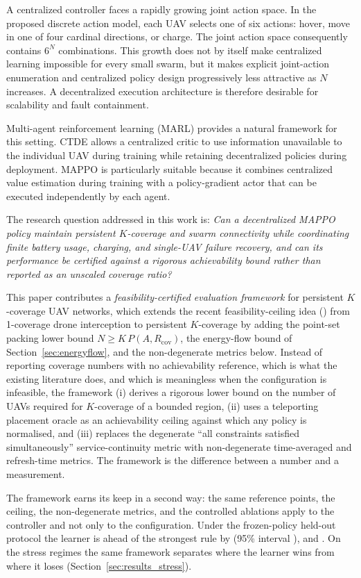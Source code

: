 \documentclass[conference]{IEEEtran}
\begin{document}
A centralized controller faces a rapidly growing joint action space. In the proposed discrete action model, each UAV selects one of six actions: hover, move in one of four cardinal directions, or charge. The joint action space consequently contains $6^N$ combinations. This growth does not by itself make centralized learning impossible for every small swarm, but it makes explicit joint-action enumeration and centralized policy design progressively less attractive as $N$ increases. A decentralized execution architecture is therefore desirable for scalability and fault containment.

Multi-agent reinforcement learning (MARL) provides a natural framework for this setting. CTDE allows a centralized critic to use information unavailable to the individual UAV during training while retaining decentralized policies during deployment. MAPPO is particularly suitable because it combines centralized value estimation during training with a policy-gradient actor that can be executed independently by each agent.

The research question addressed in this work is: \emph{Can a decentralized MAPPO policy maintain persistent $K$-coverage and swarm connectivity while coordinating finite battery usage, charging, and single-UAV failure recovery, and can its performance be certified against a rigorous achievability bound rather than reported as an unscaled coverage ratio?}

This paper contributes a \emph{feasibility-certified evaluation framework} for persistent $K$-coverage UAV networks, which extends the recent feasibility-ceiling idea (\cite{ceilings2026}) from 1-coverage drone interception to persistent $K$-coverage by adding the point-set packing lower bound $N \ge K\,P(A,R_{\mathrm{cov}})$, the energy-flow bound of Section~\ref{sec:energyflow}, and the non-degenerate metrics below.  Instead of reporting coverage numbers with no achievability reference, which is what the existing literature does, and which is meaningless when the configuration is infeasible, the framework (i) derives a rigorous lower bound on the number of UAVs required for $K$-coverage of a bounded region, (ii) uses a teleporting placement oracle as an achievability ceiling against which any policy is normalised, and (iii) replaces the degenerate ``all constraints satisfied simultaneously'' service-continuity metric with non-degenerate time-averaged and refresh-time metrics.  The framework is the difference between a number and a measurement.

The framework earns its keep in a second way: the same reference points, the ceiling, the non-degenerate metrics, and the controlled ablations apply to the controller and not only to the configuration.  Under the frozen-policy held-out protocol the learner is ahead of the strongest rule by \tokLearnerMinusRule{} (95\% interval \tokLearnerMinusRuleCi), and \tokGapVerdict.  On the stress regimes the same framework separates where the learner wins from where it loses (Section~\ref{sec:results_stress}).
\end{document}
